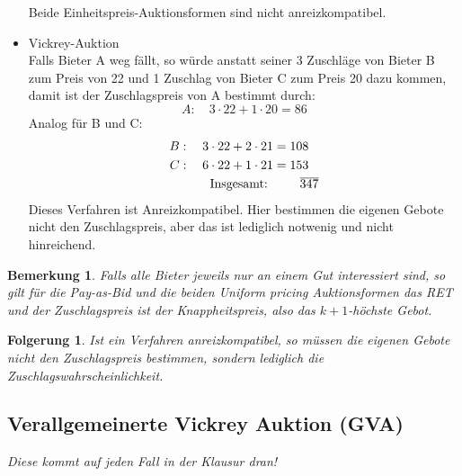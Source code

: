 \documentclass[12pt]{extreport} %
\theoremstyle{named}
\theoremstyle{nnamed}
\theoremstyle{itshape}
\theoremstyle{normal}
\newtheorem*{bemerkung}{Bemerkung}
\newtheorem*{folgerung*}{Folgerung}
\begin{document}
\begin{itemize}
\begin{itemize}
\begin{itemize}
				\end{itemize}
		\end{itemize} 
		Beide Einheitspreis-Auktionsformen sind nicht anreizkompatibel.
	\item Vickrey-Auktion ~\\
		Falls Bieter A weg fällt, so würde anstatt seiner 3 Zuschläge von Bieter B zum Preis von 22 und 1 Zuschlag von  Bieter C zum Preis 20 dazu kommen, damit ist der Zuschlagspreis von A bestimmt durch:
		$$ A: \quad 3 \cdot 22 + 1 \cdot 20 = 86 $$
		Analog für B und C:
		\begin{align*}
			B: \quad 3 \cdot 22 + 2 \cdot 21 & = 108 \\
			C: \quad 6 \cdot 22 + 1 \cdot 21 & = 153 \\
			\text{ Insgesamt: } & \hspace{0.75cm} \overline{347}
		\end{align*}
		Dieses Verfahren ist Anreizkompatibel. Hier bestimmen die eigenen Gebote nicht den Zuschlagspreis, aber das ist lediglich notwenig und nicht hinreichend.
\end{itemize}

\begin{bemerkung}
	Falls alle Bieter jeweils nur an einem Gut interessiert sind, so gilt für die Pay-as-Bid und die beiden Uniform pricing Auktionsformen das RET und der Zuschlagspreis ist der Knappheitspreis, also das $k+1$-höchste Gebot.
\end{bemerkung}

\begin{folgerung*}
	Ist ein Verfahren anreizkompatibel, so müssen die eigenen Gebote nicht den Zuschlagspreis bestimmen, sondern lediglich die Zuschlagswahrscheinlichkeit.
\end{folgerung*}

\subsection{Verallgemeinerte Vickrey Auktion (GVA)}  


\textit{Diese kommt auf jeden Fall in der Klausur dran!} %
\end{document}

